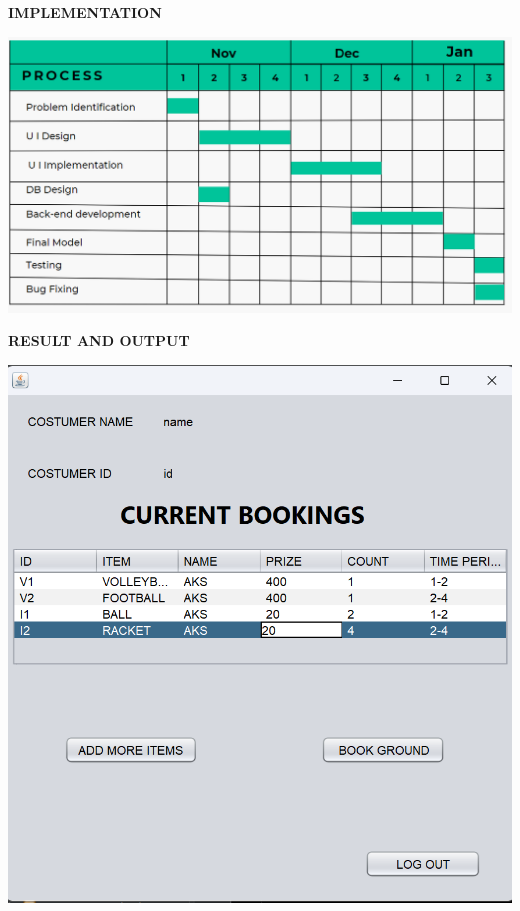 \documentclass[a4paper,12pt]{report}
\begin{document}
\begin{flushleft}
		\textbf{IMPLEMENTATION} 
\end{flushleft} 
\includegraphics[scale=1]{GANTT.png}
\begin{flushleft}
		\textbf{RESULT AND OUTPUT}
\end{flushleft} 
\includegraphics[scale=0.5]{CURRENT.png}
\end{document}
